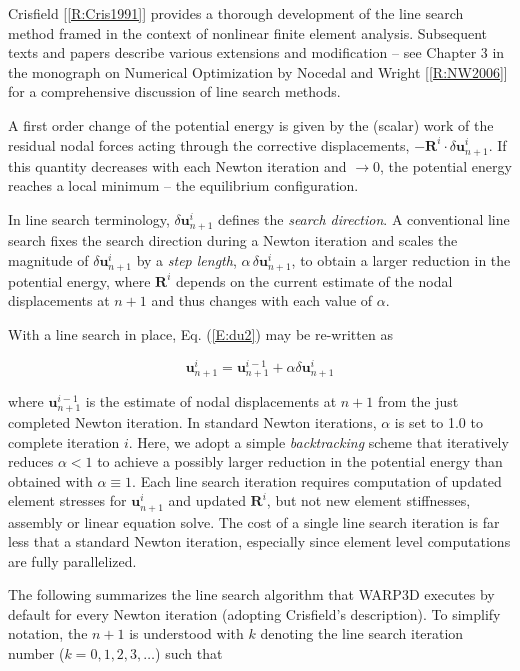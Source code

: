 \documentclass[11pt]{report}
\numberwithin{equation}{section}
\newcommand{\ti}{\emph}
\begin{document}
Crisfield [\ref{R:Cris1991}] provides a thorough development of the line search method
framed in the context of nonlinear finite element analysis.
Subsequent texts
and papers describe various extensions and modification -- see Chapter 3 in the monograph on Numerical
Optimization by Nocedal and Wright [\ref{R:NW2006}] for a comprehensive discussion
of line search methods.

A first order change of the potential energy is given by the (scalar) work of the residual nodal forces 
acting through the corrective displacements, $- \bm{R}^i\cdot \delta \bm{u}_{n+1}^i$. If this quantity decreases with
each Newton iteration and $\rightarrow 0$, the potential energy reaches a local minimum -- the equilibrium
configuration.

In line search  terminology, $\delta \bm{u}_{n+1}^i $ defines the \ti{search direction}. A
conventional line search
fixes the search direction during a Newton iteration and scales the magnitude of 
$\delta \bm{u}_{n+1}^i $ by a \ti{step length}, $\alpha\, \delta \bm{u}_{n+1}^i $, to obtain a larger reduction
in the potential energy, where $\bm{R}^i$ depends on the
current estimate of the nodal displacements at $n+1$ and thus changes with each value of $\alpha$.

With a line search in place, Eq. (\ref{E:du2}) may be re-written as

\begin{equation}\label{E:LSa}
 \bm{u}_{n+1}^i = \bm{u}_{n+1}^{i-1} + \alpha 
  \delta \bm{u}_{n+1}^i
\end{equation}

\noindent where $\bm{u}_{n+1}^{i-1}$ is the estimate of nodal displacements at $n+1$ from the
just completed Newton iteration. In standard Newton iterations, $\alpha$ is set to 1.0 to complete iteration
$i$.  Here, we adopt a simple \ti{backtracking} scheme that iteratively reduces $\alpha < 1$ to achieve a 
possibly larger reduction in the potential energy than obtained with $\alpha \equiv1$. Each line search
iteration requires computation of updated element stresses  for $\bm{u}_{n+1}^i $ and updated $\bm{R}^i$,
but not new element stiffnesses, assembly or linear equation solve. The cost of a single line search
iteration is far less that a standard Newton iteration, especially since element level computations are
fully parallelized.

The following  summarizes the line search algorithm that WARP3D executes by default for every
Newton iteration (adopting Crisfield's description). To simplify notation, the $n+1$ is understood with
$k$ denoting the line search iteration number ($k =0, 1, 2, 3, \dots$) such that 
\end{document}
